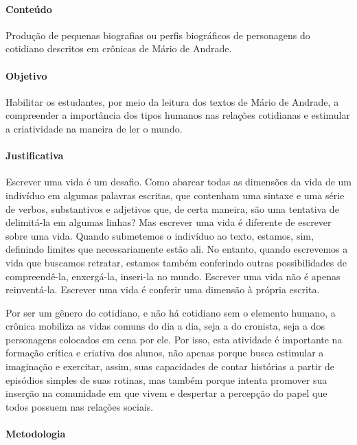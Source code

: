 \documentclass[12pt]{extarticle}
\begin{document}
\paragraph{Conteúdo} Produção de pequenas biografias ou perfis biográficos
de personagens do cotidiano descritos em crônicas de Mário de Andrade.

\paragraph{Objetivo} Habilitar os estudantes, por meio da leitura dos
textos de Mário de Andrade, a compreender a importância dos tipos
humanos nas relações cotidianas e estimular a criatividade na maneira de
ler o mundo.

\paragraph{Justificativa} Escrever uma vida é um desafio. Como abarcar
todas as dimensões da vida de um indivíduo em algumas palavras escritas,
que contenham uma sintaxe e uma série de verbos, substantivos e adjetivos
que, de certa maneira, são uma tentativa de delimitá-la em algumas
linhas? Mas escrever uma vida é diferente de escrever sobre uma vida.
Quando submetemos o indivíduo ao texto, estamos, sim, definindo limites
que necessariamente estão ali. No entanto, quando escrevemos a vida que
buscamos retratar, estamos também conferindo outras possibilidades de
compreendê-la, enxergá-la, inseri-la no mundo. Escrever uma vida não é
apenas reinventá-la. Escrever uma vida é conferir uma dimensão à própria
escrita.

Por ser um gênero do cotidiano, e não há cotidiano sem o elemento
humano, a crônica mobiliza as vidas comuns do dia a dia, seja a do
cronista, seja a dos personagens colocados em cena por ele. Por isso,
esta atividade é importante na formação crítica e criativa dos alunos,
não apenas porque busca estimular a imaginação e exercitar, assim, suas
capacidades de contar histórias a partir de episódios simples de suas
rotinas, mas também porque intenta promover sua inserção na comunidade
em que vivem e despertar a percepção do papel que todos possuem nas
relações sociais.



\paragraph{Metodologia} 
\end{document}
